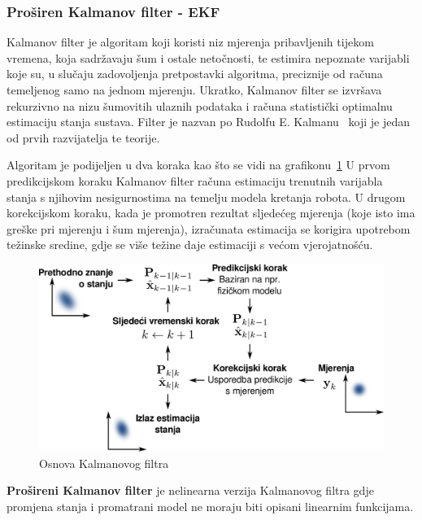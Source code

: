 \newpage
\subsubsection{Proširen Kalmanov filter - EKF} %
\label{ssub:Proširen Kalmanov filter - EKF}

Kalmanov filter je algoritam koji koristi niz mjerenja pribavljenih
tijekom vremena, koja sadržavaju šum i ostale netočnosti, te 
estimira nepoznate varijabli koje su, u slučaju zadovoljenja
pretpostavki algoritma, preciznije od računa temeljenog samo na jednom
mjerenju. Ukratko, Kalmanov filter se izvršava rekurzivno na nizu
šumovitih ulaznih podataka i računa statistički optimalnu estimaciju
stanja sustava. Filter je nazvan po Rudolfu E. Kalmanu~\cite{Kalman}
koji je jedan od prvih razvijatelja te teorije.


Algoritam je podijeljen u dva koraka kao što se vidi na
grafikonu~\ref{fig:basic-kalman} U prvom predikcijskom koraku Kalmanov
filter računa estimaciju trenutnih varijabla stanja s njihovim
nesigurnostima na temelju modela kretanja robota. U drugom korekcijskom
koraku, kada je promotren rezultat sljedećeg mjerenja (koje isto ima
greške pri mjerenju i šum mjerenja), izračunata estimacija se korigira
upotrebom težinske sredine, gdje se više težine daje estimaciji s većom
vjerojatnošću.

\begin{figure}[H]
\centering
\renewcommand{\figurename}{Grafikon}
\includegraphics[scale=0.35]{figures/basic-kalman.pdf}
\caption{Osnova Kalmanovog filtra}
\label{fig:basic-kalman}
\end{figure}

\textbf{Prošireni Kalmanov filter} je nelinearna verzija Kalmanovog
filtra gdje promjena stanja i promatrani model ne moraju biti opisani
linearnim funkcijama.

